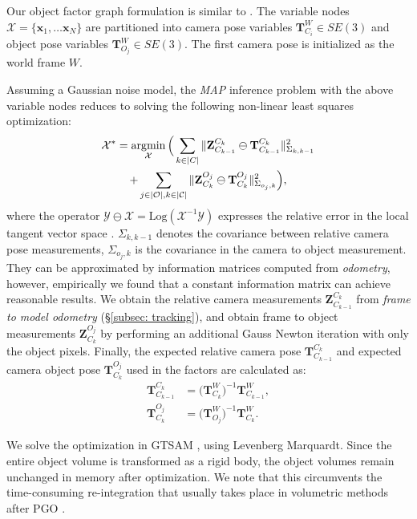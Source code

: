 Our object factor graph formulation is similar to \cite{salas-moreno_slam_2013, fusionPP}. The variable nodes $\mathcal{X} = \{\mathbf{x}_1, \dots \mathbf{x}_N\}$ are partitioned into camera pose variables $\mathbf{T}^{W}_{C_i} \in SE(3)$ and object pose variables $\mathbf{T}^W_{O_j} \in SE(3)$. The first camera pose is initialized as the world frame $W$.

Assuming a Gaussian noise model, the \textit{MAP} inference problem with the above variable nodes reduces to solving the following non-linear least squares optimization:
\begin{multline}
    \mathcal{X}^* = \operatorname*{\arg\!\min}_{\mathcal{X}} \Big( \sum_{k \in |C|} \|  \mathbf{Z}^{C_k}_{C_{k-1}} \ominus \mathbf{T}^{C_k}_{C_{k-1}} \|_{\Sigma_{k,k-1}}^2 \\
    + \sum_{j \in |\mathcal{O}|, k \in |\mathcal{C}|} \| \mathbf{Z}^{O_j}_{C_k} \ominus \mathbf{T}^{O_j}_{C_k} \|_{\Sigma_{o_j, k}}^2 \Big),
\end{multline}
where the operator $ \mathcal{Y} \ominus \mathcal{X} = \text{Log}(\mathcal{X}^{-1} \mathcal{Y})$ expresses the relative error in the local tangent vector space \cite{sola2018micro}. $\Sigma_{k, k-1}$ denotes the covariance between relative camera pose measurements,  $\Sigma_{o_j, k}$ is the covariance in the camera to object measurement. They can be approximated by information matrices computed from \textit{odometry}, however, empirically we found that a constant information matrix can achieve reasonable results. We obtain the relative camera measurements $\mathbf{Z}^{C_k}_{C_{k-1}}$ from \textit{frame to model odometry} (\S\ref{subsec: tracking}), and obtain frame to object measurements $\mathbf{Z}^{O_j}_{C_k}$ by performing an additional Gauss Newton iteration with only the object pixels. Finally, the expected relative camera pose $\mathbf{T}^{C_k}_{C_{k-1}}$ and expected camera object pose $\mathbf{T}^{O_j}_{C_k}$ used in the factors are calculated as:
\begin{align}
    \mathbf{T}^{C_k}_{C_{k-1}} &= \bigg({\mathbf{T}^{W}_{C_k}}\bigg)^{-1} \mathbf{T}^{W}_{C_{k-1}}, \\
    \mathbf{T}^{O_j}_{C_k} &= \bigg({\mathbf{T}^{W}_{O_j}}\bigg)^{-1} \mathbf{T}^{W}_{C_k}.
\end{align}

We solve the optimization in GTSAM \cite{dellaert2012factor}, using Levenberg Marquardt. Since the entire object volume is transformed as a rigid body, the object volumes remain unchanged in memory after optimization. We note that this circumvents the time-consuming re-integration that usually takes place in volumetric methods after PGO \cite{whelanElasticFusionDenseSLAM2015}.

